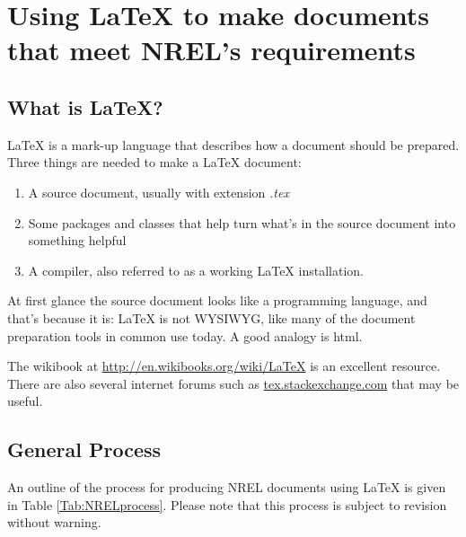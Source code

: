 \chapter{Using LaTeX to make documents that meet NREL's requirements}

\section{What is LaTeX?}
LaTeX is a mark-up language that describes how a document should be prepared. Three things are needed to make a LaTeX document:
\begin{enumerate}
\item A source document, usually with extension \emph{.tex}
\item Some packages and classes that help turn what's in the source document into something helpful
\item A compiler, also referred to as a working LaTeX installation.
\end{enumerate}

At first glance the source document looks like a programming language, and that's because it is: LaTeX is not WYSIWYG, like many of the document preparation tools in common use today. A good analogy is html.

The wikibook at \href{http://en.wikibooks.org/wiki/LaTeX}{http://en.wikibooks.org/wiki/LaTeX} is an excellent resource. There are also several internet forums such as \href{tex.stackexchange.com}{tex.stackexchange.com} that may be useful.

\section{General Process}
An outline of the process for producing NREL documents using LaTeX{} is given in Table \ref{Tab:NRELprocess}. Please note that this process is subject to revision without warning.

